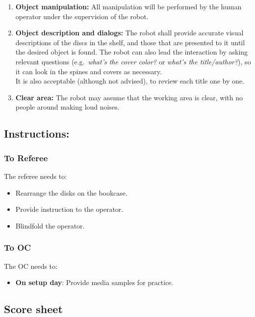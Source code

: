 \begin{enumerate}
	\item \textbf{Object manipulation:} All manipulation will be performed by the human operator under the supervision of the robot.

	\item \textbf{Object description and dialogs:} The robot shall provide accurate visual descriptions of the discs in the shelf, and those that are presented to it until the desired object is found. The robot can also lead the interaction by asking relevant questions (e.g.~\textit{what's the cover color?} or \textit{what's the title/author?}), so it can look in the spines and covers as necessary.\\
	It is also acceptable (although not advised), to review each title one by one.

	\item \textbf{Clear area:} The robot may assume that the working area is clear, with no people around making loud noises.
	

\end{enumerate}

\subsection*{Instructions:}

\subsubsection*{To Referee}

The referee needs to:
\begin{itemize}
	\item Rearrange the disks on the bookcase.
	\item Provide instruction to the operator.
	\item Blindfold the operator.
\end{itemize}

\subsubsection*{To OC}
The OC needs to:
\begin{itemize}[nosep]
	\item \textbf{On setup day}: Provide media samples for practice.
\end{itemize}

\subsection*{Score sheet}


